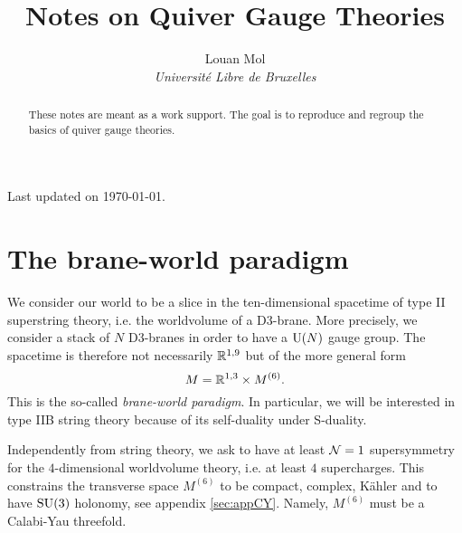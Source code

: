 \documentclass[a4paper,10pt]{article}
\title{\textbf{Notes on Quiver Gauge Theories}}
\author{Louan Mol\\ \textit{Université Libre de Bruxelles}}
\date{}
\begin{document}
\begin{titlepage}
    
    \maketitle

    \thispagestyle{empty}

    \vspace{2cm}

    \begin{abstract}
        These notes are meant as a work support. The goal is to reproduce and regroup the basics of quiver gauge theories. 
    \end{abstract}

    \vfill

    \hfill Last updated on \today.
    
\end{titlepage}
  
\pagebreak

\tableofcontents

\pagebreak

\nocite{*}

\section{The brane-world paradigm}

    We consider our world to be a slice in the ten-dimensional spacetime of type II superstring theory, i.e. the worldvolume of a D$3$-brane. More precisely, we consider a stack of $N$ D$3$-branes in order to have a $\text{U}(N)$ gauge group. The spacetime is therefore not necessarily $\mathbb{R}^{1,9}$ but of the more general form
    \begin{equation*}
        M = \mathbb{R}^{1,3}\times M^{(6)}.
    \end{equation*}
    This is the so-called \emph{brane-world paradigm}. In particular, we will be interested in type IIB string theory because of its self-duality under S-duality\marker.
    
    Independently from string theory, we ask to have at least $\mathcal{N}=1$ supersymmetry for the $4$-dimensional worldvolume theory, i.e. at least $4$ supercharges. This constrains the transverse space $M^{(6)}$ to be compact, complex, Kähler and to have $\text{SU}(3)$ holonomy, see appendix \ref{sec:appCY}. Namely, $M^{(6)}$ must be a Calabi-Yau threefold.
    
\end{document}
